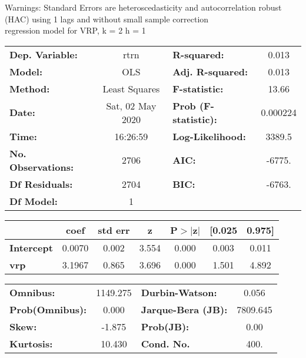 Warnings: \newline
 [1] Standard Errors are heteroscedasticity and autocorrelation robust (HAC) using 1 lags and without small sample correction\\ 

regression model for VRP, k = 2 h = 1\begin{center}
\begin{tabular}{lclc}
\toprule
\textbf{Dep. Variable:}    &       rtrn       & \textbf{  R-squared:         } &     0.013   \\
\textbf{Model:}            &       OLS        & \textbf{  Adj. R-squared:    } &     0.013   \\
\textbf{Method:}           &  Least Squares   & \textbf{  F-statistic:       } &     13.66   \\
\textbf{Date:}             & Sat, 02 May 2020 & \textbf{  Prob (F-statistic):} &  0.000224   \\
\textbf{Time:}             &     16:26:59     & \textbf{  Log-Likelihood:    } &    3389.5   \\
\textbf{No. Observations:} &        2706      & \textbf{  AIC:               } &    -6775.   \\
\textbf{Df Residuals:}     &        2704      & \textbf{  BIC:               } &    -6763.   \\
\textbf{Df Model:}         &           1      & \textbf{                     } &             \\
\bottomrule
\end{tabular}
\begin{tabular}{lcccccc}
                   & \textbf{coef} & \textbf{std err} & \textbf{z} & \textbf{P$> |$z$|$} & \textbf{[0.025} & \textbf{0.975]}  \\
\midrule
\textbf{Intercept} &       0.0070  &        0.002     &     3.554  &         0.000        &        0.003    &        0.011     \\
\textbf{vrp}       &       3.1967  &        0.865     &     3.696  &         0.000        &        1.501    &        4.892     \\
\bottomrule
\end{tabular}
\begin{tabular}{lclc}
\textbf{Omnibus:}       & 1149.275 & \textbf{  Durbin-Watson:     } &    0.056  \\
\textbf{Prob(Omnibus):} &   0.000  & \textbf{  Jarque-Bera (JB):  } & 7809.645  \\
\textbf{Skew:}          &  -1.875  & \textbf{  Prob(JB):          } &     0.00  \\
\textbf{Kurtosis:}      &  10.430  & \textbf{  Cond. No.          } &     400.  \\
\bottomrule
\end{tabular}
\end{center}

